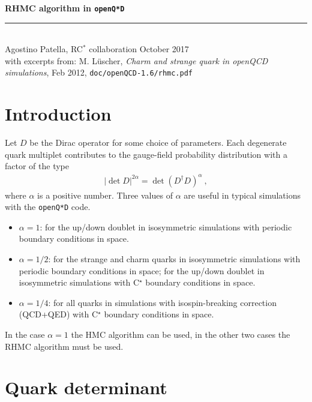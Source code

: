 \documentclass[11pt,fleqn]{article}
\begin{document}
\vspace*{20mm}

{
\sffamily
\huge
\textbf{RHMC algorithm in \texttt{openQ*D}}
\\
\rule{\textwidth}{1pt}
\\[2mm]
\large
Agostino Patella, RC$^*$ collaboration
\hfill
October 2017
\\[10mm]
\normalsize
with excerpts from: M. L\"uscher, \textit{Charm and strange quark in openQCD simulations}, Feb 2012, \texttt{doc/openQCD-1.6/rhmc.pdf}
}

\vspace{30mm}


\tableofcontents

\pagebreak


\section{Introduction}

Let $D$ be the Dirac operator for some choice of parameters. Each degenerate quark multiplet contributes to the gauge-field probability distribution with a factor of the type
\begin{gather}
   | \det D |^{2\alpha} = \det (D^\dag D)^{\alpha} \ ,
\end{gather}
where $\alpha$ is a positive number. Three values of $\alpha$ are useful in typical simulations with the \texttt{openQ*D} code.
\begin{itemize}
   \item $\alpha=1$: for the up/down doublet in isosymmetric simulations with periodic boundary conditions in space.
   \item $\alpha=1/2$: for the strange and charm quarks in isosymmetric simulations with periodic boundary conditions in space; for the up/down doublet in isosymmetric simulations with C$^\star$ boundary conditions in space.
   \item $\alpha=1/4$: for all quarks in simulations with isospin-breaking correction (QCD+QED) with C$^\star$ boundary conditions in space.
\end{itemize}
In the case $\alpha=1$ the HMC algorithm can be used, in the other two cases the RHMC algorithm must be used.


\section{Quark determinant}
\end{document}
